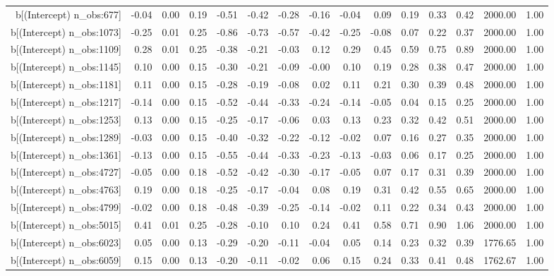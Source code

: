 \begin{table}[ht]
\begin{tabular}{rrrrrrrrrrrrrrr}
  b[(Intercept) n\_obs:677] & -0.04 & 0.00 & 0.19 & -0.51 & -0.42 & -0.28 & -0.16 & -0.04 & 0.09 & 0.19 & 0.33 & 0.42 & 2000.00 & 1.00 \\ 
  b[(Intercept) n\_obs:1073] & -0.25 & 0.01 & 0.25 & -0.86 & -0.73 & -0.57 & -0.42 & -0.25 & -0.08 & 0.07 & 0.22 & 0.37 & 2000.00 & 1.00 \\ 
  b[(Intercept) n\_obs:1109] & 0.28 & 0.01 & 0.25 & -0.38 & -0.21 & -0.03 & 0.12 & 0.29 & 0.45 & 0.59 & 0.75 & 0.89 & 2000.00 & 1.00 \\ 
  b[(Intercept) n\_obs:1145] & 0.10 & 0.00 & 0.15 & -0.30 & -0.21 & -0.09 & -0.00 & 0.10 & 0.19 & 0.28 & 0.38 & 0.47 & 2000.00 & 1.00 \\ 
  b[(Intercept) n\_obs:1181] & 0.11 & 0.00 & 0.15 & -0.28 & -0.19 & -0.08 & 0.02 & 0.11 & 0.21 & 0.30 & 0.39 & 0.48 & 2000.00 & 1.00 \\ 
  b[(Intercept) n\_obs:1217] & -0.14 & 0.00 & 0.15 & -0.52 & -0.44 & -0.33 & -0.24 & -0.14 & -0.05 & 0.04 & 0.15 & 0.25 & 2000.00 & 1.00 \\ 
  b[(Intercept) n\_obs:1253] & 0.13 & 0.00 & 0.15 & -0.25 & -0.17 & -0.06 & 0.03 & 0.13 & 0.23 & 0.32 & 0.42 & 0.51 & 2000.00 & 1.00 \\ 
  b[(Intercept) n\_obs:1289] & -0.03 & 0.00 & 0.15 & -0.40 & -0.32 & -0.22 & -0.12 & -0.02 & 0.07 & 0.16 & 0.27 & 0.35 & 2000.00 & 1.00 \\ 
  b[(Intercept) n\_obs:1361] & -0.13 & 0.00 & 0.15 & -0.55 & -0.44 & -0.33 & -0.23 & -0.13 & -0.03 & 0.06 & 0.17 & 0.25 & 2000.00 & 1.00 \\ 
  b[(Intercept) n\_obs:4727] & -0.05 & 0.00 & 0.18 & -0.52 & -0.42 & -0.30 & -0.17 & -0.05 & 0.07 & 0.17 & 0.31 & 0.39 & 2000.00 & 1.00 \\ 
  b[(Intercept) n\_obs:4763] & 0.19 & 0.00 & 0.18 & -0.25 & -0.17 & -0.04 & 0.08 & 0.19 & 0.31 & 0.42 & 0.55 & 0.65 & 2000.00 & 1.00 \\ 
  b[(Intercept) n\_obs:4799] & -0.02 & 0.00 & 0.18 & -0.48 & -0.39 & -0.25 & -0.14 & -0.02 & 0.11 & 0.22 & 0.34 & 0.43 & 2000.00 & 1.00 \\ 
  b[(Intercept) n\_obs:5015] & 0.41 & 0.01 & 0.25 & -0.28 & -0.10 & 0.10 & 0.24 & 0.41 & 0.58 & 0.71 & 0.90 & 1.06 & 2000.00 & 1.00 \\ 
  b[(Intercept) n\_obs:6023] & 0.05 & 0.00 & 0.13 & -0.29 & -0.20 & -0.11 & -0.04 & 0.05 & 0.14 & 0.23 & 0.32 & 0.39 & 1776.65 & 1.00 \\ 
  b[(Intercept) n\_obs:6059] & 0.15 & 0.00 & 0.13 & -0.20 & -0.11 & -0.02 & 0.06 & 0.15 & 0.24 & 0.33 & 0.41 & 0.48 & 1762.67 & 1.00 \\ 

\end{tabular}
\end{table}
